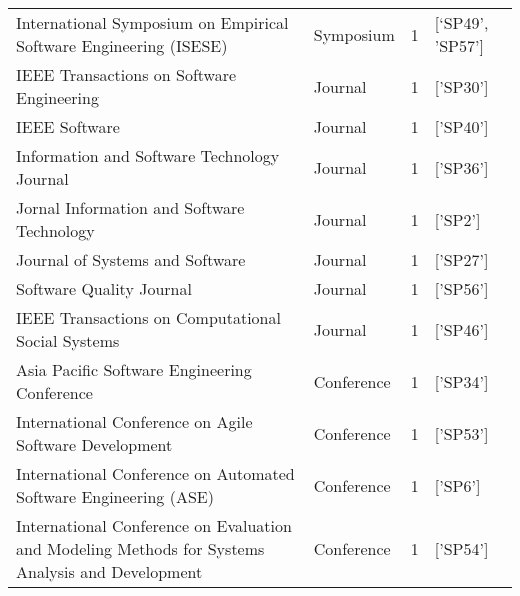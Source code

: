 \begin{tabular}{llrl}
                                International Symposium on Empirical Software Engineering (ISESE) &   Symposium &      1 &                                         [‘SP49’, 'SP57'] \\
                                                        IEEE Transactions on Software Engineering &     Journal &      1 &                                                 ['SP30'] \\
                                                                                    IEEE Software &     Journal &      1 &                                                 ['SP40'] \\
                                                      Information and Software Technology Journal &     Journal &      1 &                                                 ['SP36'] \\
                                                       Jornal Information and Software Technology &     Journal &      1 &                                                  ['SP2'] \\
                                                                  Journal of Systems and Software &     Journal &      1 &                                                 ['SP27'] \\
                                                                         Software Quality Journal &     Journal &      1 &                                                 ['SP56'] \\
                                                IEEE Transactions on Computational Social Systems &     Journal &      1 &                                                 ['SP46'] \\
                                                     Asia Pacific Software Engineering Conference &  Conference &      1 &                                                 ['SP34'] \\
                                           International Conference on Agile Software Development &  Conference &      1 &                                                 ['SP53'] \\
                                 International Conference on Automated Software Engineering (ASE) &  Conference &      1 &                                                  ['SP6'] \\
 International Conference on Evaluation and Modeling Methods for Systems Analysis and Development &  Conference &      1 &                                                 ['SP54'] \\

\end{tabular}
